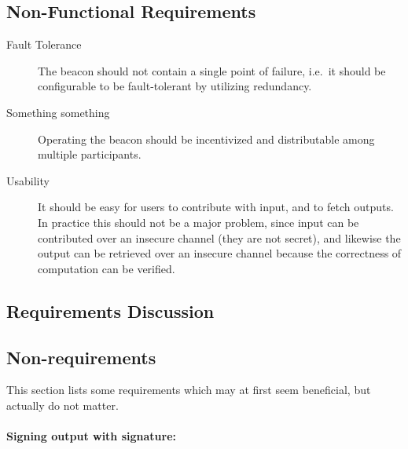 \subsection{Non-Functional Requirements}
\label{sub:non_functional_requirements}

\begin{description}
    \item[Fault Tolerance] The beacon should not contain a single point of failure, i.e.\ it should be configurable to be fault-tolerant by utilizing redundancy.

    \item[Something something] Operating the beacon should be incentivized and distributable among multiple participants.   

    \item[Usability] It should be easy for users to contribute with input, and to fetch outputs. In practice this should not be a major problem, since input can be contributed over an insecure channel (they are not secret), and likewise the output can be retrieved over an insecure channel because the correctness of computation can be verified.
\end{description}

\subsection{Requirements Discussion}


\subsection{Non-requirements}
This section lists some requirements which may at first seem beneficial, but actually do not matter.

\paragraph{Signing output with signature:}

